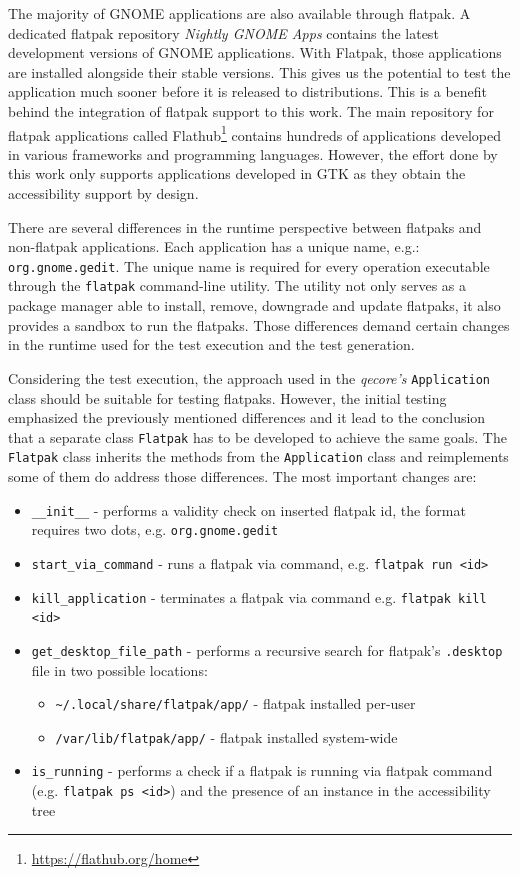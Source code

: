 The majority of GNOME applications are also available through flatpak. A dedicated flatpak repository \textit{Nightly GNOME Apps} contains the latest development versions of GNOME applications. With Flatpak, those applications are installed alongside their stable versions. This gives us the potential to test the application much sooner before it is released to distributions. This is a benefit behind the integration of flatpak support to this work. The main repository for flatpak applications called Flathub\footnote{\url{https://flathub.org/home}} contains hundreds of applications developed in various frameworks and programming languages. However, the effort done by this work only supports applications developed in GTK as they obtain the accessibility support by design.

There are several differences in the runtime perspective between flatpaks and non-flatpak applications. Each application has a unique name, e.g.: \texttt{org.gnome.gedit}. The unique name is required for every operation executable through the \texttt{flatpak} command-line utility. The utility not only serves as a package manager able to install, remove, downgrade and update flatpaks, it also provides a sandbox to run the flatpaks. Those differences demand certain changes in the runtime used for the test execution and the test generation. 

Considering the test execution, the approach used in the \textit{qecore's} \texttt{Application} class should be suitable for testing flatpaks. However, the initial testing emphasized the previously mentioned differences and it lead to the conclusion that a separate class \texttt{Flatpak} has to be developed to achieve the same goals. The \texttt{Flatpak} class inherits the methods from the \texttt{Application} class and reimplements some of them do address those differences. The most important changes are:

\begin{itemize} 
    \item \texttt{\_\_init\_\_} - performs a validity check on inserted flatpak id, the format requires two dots, e.g. \texttt{org.gnome.gedit}
    \item \texttt{start\_via\_command} - runs a flatpak via command, e.g. \texttt{flatpak run <id>}
    \item \texttt{kill\_application} - terminates a flatpak via command e.g. \texttt{flatpak kill <id>}
    \item \texttt{get\_desktop\_file\_path} - performs a recursive search for flatpak's \texttt{.desktop} file in two possible locations:
    \begin{itemize}
        \item \texttt{\textasciitilde/.local/share/flatpak/app/} - flatpak installed per-user
        \item \texttt{/var/lib/flatpak/app/} - flatpak installed system-wide
    \end{itemize} 
    \item \texttt{is\_running} - performs a check if a flatpak is running via flatpak command (e.g. \texttt{flatpak ps <id>}) and the presence of an instance in the accessibility tree
\end{itemize}

